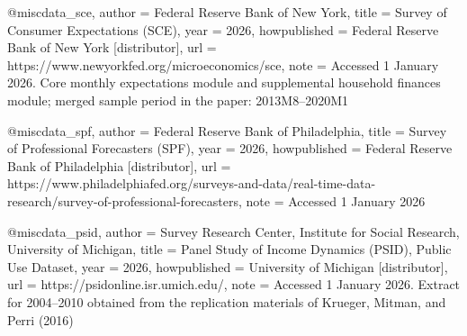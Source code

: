 %
%


@misc{data_sce,
  author       = {{Federal Reserve Bank of New York}},
  title        = {Survey of Consumer Expectations ({SCE})},
  year         = {2026},
  howpublished = {Federal Reserve Bank of New York [distributor]},
  url          = {https://www.newyorkfed.org/microeconomics/sce},
  note         = {Accessed 1 January 2026. Core monthly expectations module and supplemental household finances module; merged sample period in the paper: 2013M8--2020M1}
}

@misc{data_spf,
  author       = {{Federal Reserve Bank of Philadelphia}},
  title        = {Survey of Professional Forecasters ({SPF})},
  year         = {2026},
  howpublished = {Federal Reserve Bank of Philadelphia [distributor]},
  url          = {https://www.philadelphiafed.org/surveys-and-data/real-time-data-research/survey-of-professional-forecasters},
  note         = {Accessed 1 January 2026}
}

@misc{data_psid,
  author       = {{Survey Research Center, Institute for Social Research, University of Michigan}},
  title        = {Panel Study of Income Dynamics ({PSID}), Public Use Dataset},
  year         = {2026},
  howpublished = {University of Michigan [distributor]},
  url          = {https://psidonline.isr.umich.edu/},
  note         = {Accessed 1 January 2026. Extract for 2004--2010 obtained from the replication materials of Krueger, Mitman, and Perri (2016)}
}

